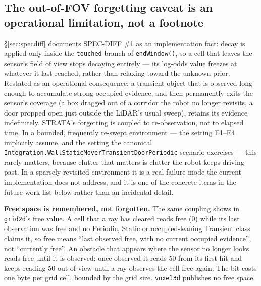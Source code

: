 \documentclass[conference]{IEEEtran}
\begin{document}
\subsection{The out-of-FOV forgetting caveat is an operational limitation, not a footnote}

\S\ref{sec:specdiff} documents SPEC-DIFF \#1 as an implementation fact: decay is applied only
inside the \texttt{touched} branch of \texttt{endWindow()}, so a cell that leaves the
sensor's field of view stops decaying entirely --- its log-odds value freezes
at whatever it last reached, rather than relaxing toward the unknown prior.
Restated as an operational consequence: a transient object that is observed
long enough to accumulate strong occupied evidence, and then permanently
exits the sensor's coverage (a box dragged out of a corridor the robot no
longer revisits, a door propped open just outside the LiDAR's usual sweep),
retains its evidence indefinitely. STRATA's forgetting is coupled to
re-observation, not to elapsed time. In a bounded, frequently re-swept
environment --- the setting E1--E4 implicitly assume, and the setting the
canonical \texttt{Integration.WallStaticMoverTransientDoorPeriodic} scenario exercises
--- this rarely matters, because clutter that matters is clutter the robot
keeps driving past. In a sparsely-revisited environment it is a real failure
mode the current implementation does not address, and it is one of the
concrete items in the future-work list below rather than an incidental
detail.

\textbf{Free space is remembered, not forgotten.} The same coupling shows in
\texttt{grid2d}'s free value. A cell that a ray has cleared reads free (0) while
its last observation was free and no Periodic, Static or occupied-leaning
Transient class claims it, so free means ``last observed free, with no current
occupied evidence'', not ``currently free''. An obstacle that appears where the
sensor no longer looks reads free until it is observed; once observed it reads
50 from its first hit and keeps reading 50 out of view until a ray observes the
cell free again. The bit costs one byte
per grid cell, bounded by the grid size. \texttt{voxel3d} publishes no free
space.
\end{document}

